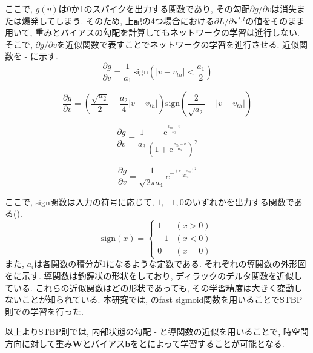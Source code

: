 ここで, $g(v)$は0か1のスパイクを出力する関数であり, その勾配$\partial g / \partial v$は消失または爆発してしまう.
そのため, 上記の4つ場合における$\partial L / \partial \bm{v}^{t,l}$の値をそのまま用いて, 重みとバイアスの勾配を計算してもネットワークの学習は進行しない.
そこで, $\partial g / \partial v$を近似関数で表すことでネットワークの学習を進行させる.
近似関数を - に示す.
\begin{equation}
    \frac{\partial g}{\partial v} = \frac{1}{a_1} \, \text{sign}\left(|v - v_{th}| < \frac{a_1}{2}\right) \label{eq:stbp:g1}
\end{equation}

\begin{equation}
    \frac{\partial g}{\partial v} = \left(\frac{\sqrt{a_2}}{2} - \frac{a_2}{4} |v - v_{th}|\right) \text{sign}\left(\frac{2}{\sqrt{a_2}} - |v - v_{th}|\right) \label{eq:stbp:g2}
\end{equation}

\begin{equation}
    \frac{\partial g}{\partial v} = \frac{1}{a_3} \frac{ \mathrm{e}^{\frac{v_{th}-v}{a_3} }} {\left( 
        1 + \mathrm{e}^{\frac{v_{th}-v}{a_3}}
     \right)^2} \label{eq:stbp:g3}
\end{equation}

\begin{equation}
    \frac{\partial g}{\partial v} = \frac{1}{\sqrt{2\pi a_4}} e^{-\frac{\left(v - v_{th}\right)^2}{2a_4}} \label{eq:stbp:g4}
\end{equation}

ここで, sign関数は入力の符号に応じて, $1, -1, 0$のいずれかを出力する関数である().
\begin{equation}
    \text{sign}(x) = \begin{cases}
        1 & (x > 0) \\
        -1 & (x < 0) \\
        0 & (x = 0)
    \end{cases} \label{eq:stbp:sign}
\end{equation}
また, $a_i$は各関数の積分が1になるような定数である.
それぞれの導関数の外形図をに示す.
導関数は釣鐘状の形状をしており, ディラックのデルタ関数を近似している.
これらの近似関数はどの形状であっても, その学習精度は大きく変動しないことが知られている.
本研究では, のfast sigmoid関数を用いることでSTBP則での学習を行った.

以上よりSTBP則では, 内部状態の勾配 - と導関数の近似を用いることで, 時空間方向に対して重み$\bm{W}$とバイアス$\bm{b}$をとによって学習することが可能となる.

